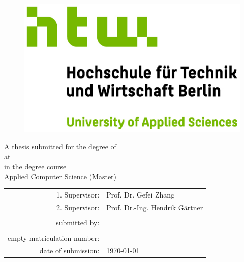 \begin{titlepage}
		\begin{center}
		\begin{figure}[h]
			
				\hfill
				\begin{minipage}[hbt]{6cm}
				\includegraphics[scale=1.3]{images/htw_logo_rgb.jpg}
				
				\end{minipage}
			\end{figure}
			\vfill
			{\Large \textbf {\thesisTitle}\par}
			\vskip 0.5cm
			
			{\large A thesis submitted for the degree of\\ \bfseries \gradeType}
			\vskip 0.5cm
			{\large at}
			\vskip 0.5cm
			\large \universityName\\ 
			in the degree course\\
			Applied Computer Science (Master)\\
			\vfill{}
			\begin{flushleft}
				\begin{tabular}[t]{rl}
					1. Supervisor: &Prof. Dr. Gefei Zhang\\
					2. Supervisor: &Prof. Dr.-Ing. Hendrik Gärtner\\
					\\
					submitted by: &\thesisAuthor\\
					\ifx\\empty
					\else
					matriculation number: & \matrNumber\\
					\fi
					date of submission: & \today
				\end{tabular}
			\end{flushleft}
		\end{center}
		\restoregeometry
	\end{titlepage}



